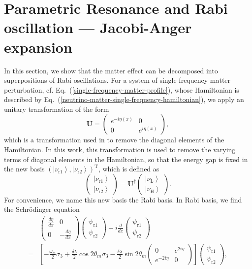\documentclass[%
reprint,
 amsmath,amssymb,
 aps,
]{revtex4-1}
\newcommand{\ket}[1]{\left| #1\right\rangle}
\begin{document}
\section{\label{sec:jacobi}Parametric Resonance and Rabi oscillation --- Jacobi-Anger expansion}


In this section, we show that the matter effect can be decomposed into superpositions of Rabi oscillations. For a system of single frequency matter perturbation, cf. Eq.~(\ref{single-frequency-matter-profile}), whose Hamiltonian is described by Eq.~(\ref{neutrino-matter-single-frequency-hamiltonian}), we apply an unitary transformation of the form
\begin{equation}
    \mathbf{U} =  \begin{pmatrix} e^{-i \eta (x)} & 0 \\  0 & e^{i \eta (x)}  \end{pmatrix},
\end{equation}
which is a transformation used in \cite{Kneller2006} to remove the diagonal elements of the Hamiltonian. In this work, this transformation is used to remove the varying terms of diagonal elements in the Hamiltonian, so that the energy gap is fixed in the new basis $\left(\ket{\nu_{\mathrm{r1}}},\ket{\nu_{\mathrm{r2}}}\right)^{\mathrm{T}}$, which is defined as
\begin{equation}
    \begin{pmatrix} \ket{\nu_{\mathrm{r1}}}\\ \ket{\nu_{\mathrm{r2}}} \end{pmatrix} =  \mathbf{U}^\dagger \begin{pmatrix} \ket{\nu_{\mathrm{L}}} \\ \ket{\nu_{\mathrm{H}}} \end{pmatrix}.
\end{equation}
For convenience, we name this new basis the Rabi basis. In Rabi basis, we find the Schr\"{o}dinger equation
\begin{align*}
    &\begin{pmatrix}  \frac{d\eta}{dx}  & 0 \\ 0 & - \frac{d\eta}{dx}  \end{pmatrix} \begin{pmatrix} \psi_{\mathrm r1} \\ \psi_{\mathrm r2} \end{pmatrix} + i \frac{d}{dx} \begin{pmatrix} \psi_{\mathrm r1} \\ \psi_{\mathrm r2} \end{pmatrix} \\
    =&
\left[ -\frac{\omega_m}{2} \sigma_3  + \frac{\delta \lambda}{2} \cos 2\theta_m  \sigma_3  - \frac{\delta \lambda}{2} \sin 2\theta_m \begin{pmatrix} 0 & e^{2i\eta} \\ e^{-2 i\eta } & 0 \end{pmatrix}   \right] \begin{pmatrix} \psi_{\mathrm r1} \\ \psi_{\mathrm r2} \end{pmatrix},
\end{align*}
\end{document}
